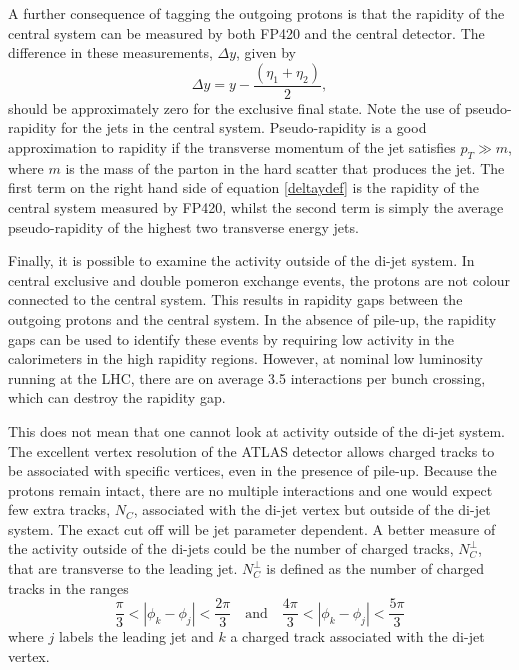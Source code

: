 A further consequence of tagging the outgoing protons is
that the rapidity of the central system can be measured by both FP420 and the central detector. The difference in these measurements, $\Delta y$, given by 
\begin{equation}\label{deltaydef}
\Delta y = y - \frac{\left(\eta_1 + \eta_2 \right)}{2}    ,
\end{equation}
should be approximately zero for the exclusive final state. Note the use of pseudo-rapidity for the jets in the central system. Pseudo-rapidity is a good approximation to rapidity if the transverse momentum of the jet satisfies $p_T \gg m$, where $m$ is the mass of the parton in the hard scatter that produces the jet.
The first term on the right hand side of equation \ref{deltaydef} is the rapidity of the central system measured by FP420, whilst the second term is simply the average pseudo-rapidity of the highest two transverse energy jets.

Finally, it is possible to examine the activity outside of the di-jet system. In central exclusive and double pomeron exchange events, the protons are not colour connected to the central system. This results in rapidity gaps between the outgoing protons and the central system. In the absence of pile-up, the rapidity gaps can be used to identify these events by requiring low activity in the calorimeters in the high rapidity regions. However, at nominal low luminosity running at the LHC, there are on average 3.5 interactions per bunch crossing, which can destroy the rapidity gap.

This does not mean that one cannot look at activity outside of the di-jet system. The excellent vertex resolution of the ATLAS detector allows charged tracks to be associated with specific vertices, even in the presence of pile-up. Because the protons remain intact, there are no multiple interactions and one would expect few extra tracks, $N_C$, associated with the di-jet vertex but outside of the di-jet system. The exact cut off will be jet parameter dependent. 
A better measure of the activity outside of the di-jets could be the number of charged tracks, $N_{C}^{\perp}$, that are transverse to the leading jet. $N_{C}^{\perp}$ is defined as the number of charged tracks in the ranges 
\begin{equation} \label{ncperp}
\frac{\pi}{3}<|\phi_{k} -\phi_j|<\frac{2\pi}{3} \quad \text{and} \quad \frac{4\pi}{3}<|\phi_{k} -\phi_j|<\frac{5\pi}{3}  
\end{equation}
where $j$ labels the leading jet and $k$ a charged track associated with the di-jet vertex.

